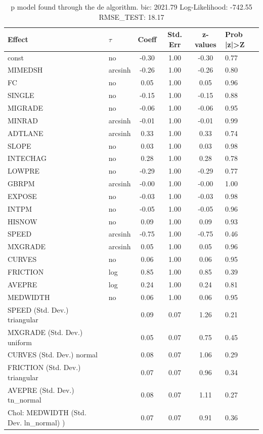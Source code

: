 \begin{table}
	\caption{p model found through the de algorithm. bic: 2021.79 Log-Likelihood: -742.55 RMSE_TEST: 18.17}
	\begin{center}
		\begin{tabular}{|l|l|c|c|c|l|}
			\hline
			Effect & $\tau$ & Coeff & Std. Err & z-values & Prob |z|>Z \\
			\hline
			const & no & -0.30 & 1.00 & -0.30 & 0.77 \\
			\hline
			MIMEDSH & arcsinh & -0.26 & 1.00 & -0.26 & 0.80 \\
			\hline
			FC & no & 0.05 & 1.00 & 0.05 & 0.96 \\
			\hline
			SINGLE & no & -0.15 & 1.00 & -0.15 & 0.88 \\
			\hline
			MIGRADE & no & -0.06 & 1.00 & -0.06 & 0.95 \\
			\hline
			MINRAD & arcsinh & -0.01 & 1.00 & -0.01 & 0.99 \\
			\hline
			ADTLANE & arcsinh & 0.33 & 1.00 & 0.33 & 0.74 \\
			\hline
			SLOPE & no & 0.03 & 1.00 & 0.03 & 0.98 \\
			\hline
			INTECHAG & no & 0.28 & 1.00 & 0.28 & 0.78 \\
			\hline
			LOWPRE & no & -0.29 & 1.00 & -0.29 & 0.77 \\
			\hline
			GBRPM & arcsinh & -0.00 & 1.00 & -0.00 & 1.00 \\
			\hline
			EXPOSE & no & -0.03 & 1.00 & -0.03 & 0.98 \\
			\hline
			INTPM & no & -0.05 & 1.00 & -0.05 & 0.96 \\
			\hline
			HISNOW & no & 0.09 & 1.00 & 0.09 & 0.93 \\
			\hline
			SPEED & arcsinh & -0.75 & 1.00 & -0.75 & 0.46 \\
			\hline
			MXGRADE & arcsinh & 0.05 & 1.00 & 0.05 & 0.96 \\
			\hline
			CURVES & no & 0.06 & 1.00 & 0.06 & 0.95 \\
			\hline
			FRICTION & log & 0.85 & 1.00 & 0.85 & 0.39 \\
			\hline
			AVEPRE & log & 0.24 & 1.00 & 0.24 & 0.81 \\
			\hline
			MEDWIDTH & no & 0.06 & 1.00 & 0.06 & 0.95 \\
			\hline
			SPEED (Std. Dev.) triangular &  & 0.09 & 0.07 & 1.26 & 0.21 \\
			\hline
			MXGRADE (Std. Dev.) uniform &  & 0.05 & 0.07 & 0.75 & 0.45 \\
			\hline
			CURVES (Std. Dev.) normal &  & 0.08 & 0.07 & 1.06 & 0.29 \\
			\hline
			FRICTION (Std. Dev.) triangular &  & 0.07 & 0.07 & 0.96 & 0.34 \\
			\hline
			AVEPRE (Std. Dev.) tn_normal &  & 0.08 & 0.07 & 1.11 & 0.27 \\
			\hline
			 Chol: MEDWIDTH (Std. Dev. ln_normal) ) &  & 0.07 & 0.07 & 0.91 & 0.36 \\
			\hline
		\end{tabular}
	\end{center}
\end{table}